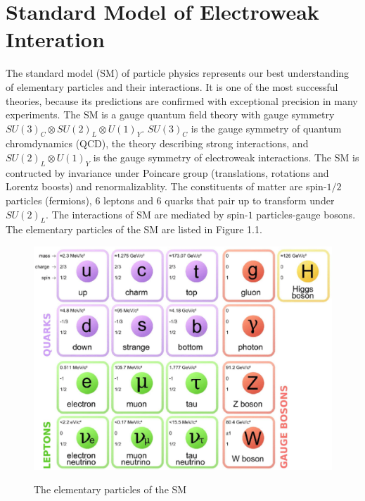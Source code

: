 
\chapter{Standard Model of Electroweak Interation}
The standard model (SM) of particle physics represents our best understanding of elementary particles and their interactions. It is one of the most successful theories, because its predictions are confirmed with exceptional precision in many experiments. The SM is a gauge quantum field theory with gauge symmetry $SU(3)_C \otimes SU(2)_L \otimes U(1)_Y$\cite{Glashow1961,Weinberg,Salam,GIM,GG,Pol,Pol1,GrossWil,GrossWil1, SWQCD, SWQCD1,SW,thooft1,thooft2,tHooftVeltman,tHV}. $SU(3)_C$ is the gauge symmetry of quantum chromdynamics (QCD), the theory describing strong interactions, and $SU(2)_L \otimes U(1)_Y$ is the gauge symmetry of electroweak interactions. The SM is contructed by invariance under Poincare group (translations, rotations and Lorentz boosts) and renormalizablity. The constituents of matter are spin-$1/2$ particles (fermions), 6 leptons and 6 quarks that pair up to transform under $SU(2)_L$. The interactions of SM are mediated by spin-$1$ particles-gauge bosons. The elementary particles of the SM are listed in Figure 1.1.
\begin{figure}
	\begin{center}
		\includegraphics[scale=0.45]{Particle.eps}\\
		\caption{ The elementary particles of the SM  }
	\end{center}
\end{figure}

